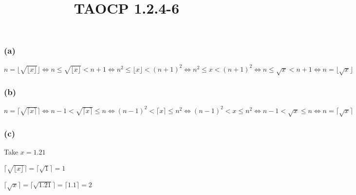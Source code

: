 \documentclass{article}
\title{TAOCP 1.2.4\mbox{-}6}
\begin{document}
\maketitle

\subsubsection*{(a)}

\( n = \lfloor \sqrt{\lfloor x\rfloor} \rfloor \iff n \leq \sqrt{\lfloor x\rfloor} < n + 1 \iff n^{2} \leq \lfloor x\rfloor < {(n+1)}^{2} \iff n^{2} \leq x < {(n+1)}^{2} \iff n \leq \sqrt{x} < n + 1 \iff n = \lfloor \sqrt{x} \rfloor \)

\subsubsection*{(b)}

\( n = \lceil \sqrt{\lceil x\rceil} \rceil \iff n - 1 < \sqrt{\lceil x\rceil} \leq n \iff {(n-1)}^{2} < \lceil x\rceil \leq n^{2} \iff {(n-1)}^{2} < x \leq n^{2} \iff n - 1 < \sqrt{x} \leq n \iff n = \lceil \sqrt{x} \rceil \)

\subsubsection*{(c)}

Take \( x = 1.21 \)

\( \lceil \sqrt{\lfloor x\rfloor} \rceil = \lceil \sqrt{1} \rceil = 1 \)

\( \lceil \sqrt{x} \rceil = \lceil \sqrt{1.21} \rceil = \lceil 1.1 \rceil = 2 \)
\end{document}

